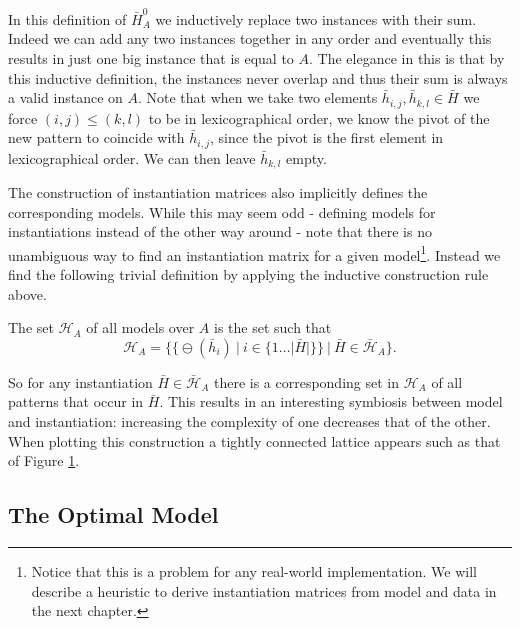 \documentclass[a4paper,notoc,oneside]{tufte-book}
\begin{document}
In this definition of $\bar{H}_A^0$ we inductively replace two instances with their sum. Indeed we can add any two instances together in any order and eventually this results in just one big instance that is equal to $A$. The elegance in this is that by this inductive definition, the instances never overlap and thus their sum is always a valid instance on $A$. Note that when we take two elements $\bar{h}_{i,j},\bar{h}_{k,l} \in \bar{H}$ we force $(i,j)\leq(k,l)$ to be in lexicographical order, we know the pivot of the new pattern to coincide with $\bar{h}_{i,j}$, since the pivot is the first element in lexicographical order. We can then leave $\bar{h}_{k,l}$ empty.

The construction of instantiation matrices also implicitly defines the corresponding models. While this may seem odd - defining models for instantiations instead of the other way around - note that there is no unambiguous way to find an instantiation matrix for a given model\footnote{Notice that this is a problem for any real-world implementation. We will describe a heuristic to derive instantiation matrices from model and data in the next chapter.}. Instead we find the following trivial definition by applying the inductive construction rule above.
\begin{definition}
The set $\mathcal{H}_A$ of all models over $A$ is the set such that 
$$
\mathcal{H}_A=\Big\{\big\{\ominus(\bar{h}_{i}) \ | \ i \in \{1\dots |\bar{H}|\}\big\} \ \Big | \ \bar{H} \in \bar{\mathcal{H}}_A \Big\}.
$$ 
\end{definition}
So for any instantiation $\bar{H}\in \bar{\mathcal{H}}_A$ there is a corresponding set in $\mathcal{H}_A$ of all patterns that occur in $\bar{H}$. This results in an interesting symbiosis between model and instantiation: increasing the complexity of one decreases that of the other. When plotting this construction a tightly connected lattice appears such as that of Figure \ref{lattice}. 

\begin{figure}

\label{lattice}
\end{figure}

\subsection{The Optimal Model}
\end{document}

